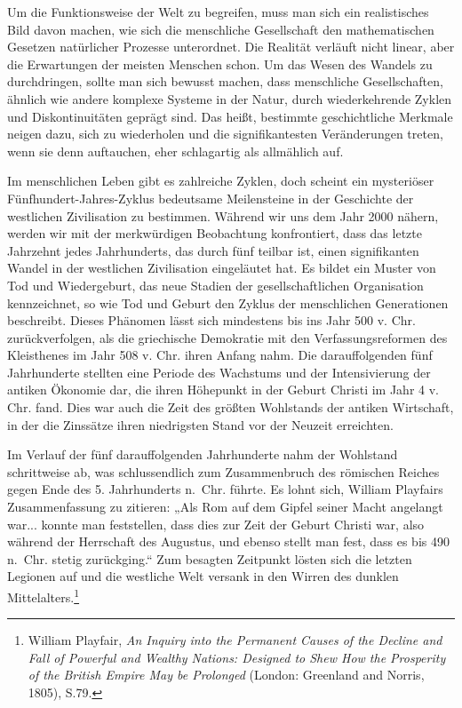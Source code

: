 \documentclass[
  a5paper,
  smalldemyvopaper,10pt,twoside,onecolumn,openright,extrafontsizes,hidelinks]{memoir}
\begin{document}
Um die Funktionsweise der Welt zu begreifen, muss man sich ein
realistisches Bild davon machen, wie sich die menschliche Gesellschaft
den mathematischen Gesetzen natürlicher Prozesse unterordnet. Die
Realität verläuft nicht linear, aber die Erwartungen der meisten
Menschen schon. Um das Wesen des Wandels zu durchdringen, sollte man
sich bewusst machen, dass menschliche Gesellschaften, ähnlich wie andere
komplexe Systeme in der Natur, durch wiederkehrende Zyklen und
Diskontinuitäten geprägt sind. Das heißt, bestimmte geschichtliche
Merkmale neigen dazu, sich zu wiederholen und die signifikantesten
Veränderungen treten, wenn sie denn auftauchen, eher schlagartig als
allmählich auf.

Im menschlichen Leben gibt es zahlreiche Zyklen, doch scheint ein
mysteriöser Fünfhundert-Jahres-Zyklus bedeutsame Meilensteine in der
Geschichte der westlichen Zivilisation zu bestimmen. Während wir uns dem
Jahr 2000 nähern, werden wir mit der merkwürdigen Beobachtung
konfrontiert, dass das letzte Jahrzehnt jedes Jahrhunderts, das durch
fünf teilbar ist, einen signifikanten Wandel in der westlichen
Zivilisation eingeläutet hat. Es bildet ein Muster von Tod und
Wiedergeburt, das neue Stadien der gesellschaftlichen Organisation
kennzeichnet, so wie Tod und Geburt den Zyklus der menschlichen
Generationen beschreibt. Dieses Phänomen lässt sich mindestens bis ins
Jahr 500 v. Chr. zurückverfolgen, als die griechische Demokratie mit den
Verfassungsreformen des Kleisthenes im Jahr 508 v. Chr. ihren Anfang
nahm. Die darauffolgenden fünf Jahrhunderte stellten eine Periode des
Wachstums und der Intensivierung der antiken Ökonomie dar, die ihren
Höhepunkt in der Geburt Christi im Jahr 4 v. Chr. fand. Dies war auch
die Zeit des größten Wohlstands der antiken Wirtschaft, in der die
Zinssätze ihren niedrigsten Stand vor der Neuzeit erreichten.

Im Verlauf der fünf darauffolgenden Jahrhunderte nahm der Wohlstand
schrittweise ab, was schlussendlich zum Zusammenbruch des römischen
Reiches gegen Ende des 5. Jahrhunderts n.~Chr. führte. Es lohnt sich,
William Playfairs Zusammenfassung zu zitieren: „Als Rom auf dem Gipfel
seiner Macht angelangt war... konnte man feststellen, dass dies zur Zeit
der Geburt Christi war, also während der Herrschaft des Augustus, und
ebenso stellt man fest, dass es bis 490 n.~Chr. stetig zurückging.`` Zum
besagten Zeitpunkt lösten sich die letzten Legionen auf und die
westliche Welt versank in den Wirren des dunklen
Mittelalters.\footnote{William Playfair, \emph{An Inquiry into the
  Permanent Causes of the Decline and Fall of Powerful and Wealthy
  Nations: Designed to Shew How the Prosperity of the British Empire May
  be Prolonged} (London: Greenland and Norris, 1805), S.79.}
\end{document}

